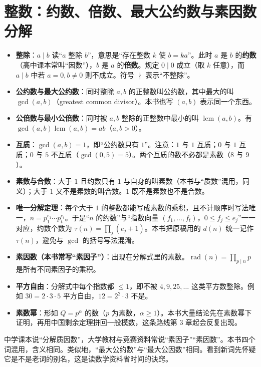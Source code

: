 \documentclass[UTF8,a4paper,11pt,oneside,openany,fontset=fandol]{ctexbook}
\theoremstyle{definition}
\newcommand{\lcm}{\operatorname{lcm}}
\newcommand{\rad}{\operatorname{rad}}
\begin{document}
\section{整数：约数、倍数、最大公约数与素因数分解}
\begin{itemize}
\item \textbf{整除}：$a\mid b$ 读“$a$ 整除 $b$”，意思是“存在整数 $k$ 使 $b=ka$”。此时 $a$ 是 $b$ 的\textbf{约数}（高中课本常叫“因数”），$b$ 是 $a$ 的\textbf{倍数}。规定 $0\mid 0$ 成立（取 $k$ 任意），而 $a\mid b$ 中若 $a=0,b\ne0$ 则不成立。符号 $\nmid$ 表示“不整除”。
\item \textbf{公约数与最大公约数}：同时整除 $a,b$ 的正整数叫公约数，其中最大的叫 $\gcd(a,b)$（greatest common divisor）。本书也写 $(a,b)$ 表示同一个东西。
\item \textbf{公倍数与最小公倍数}：同时被 $a,b$ 整除的正整数中最小的叫 $\lcm(a,b)$。有 $\gcd(a,b)\lcm(a,b)=ab$（$a,b>0$）。
\item \textbf{互质}：$\gcd(a,b)=1$，即“公约数只有 $1$”。注意：$1$ 与 $1$ 互质；$0$ 与 $1$ 互质；$0$ 与 $5$ 不互质（$\gcd(0,5)=5$）。两个互质的数不必都是素数（$8$ 与 $9$）。
\item \textbf{素数与合数}：大于 $1$ 且约数只有 $1$ 与自身的叫素数（本书与“质数”混用，同义）；大于 $1$ 又不是素数的叫合数。$1$ 既不是素数也不是合数。
\item \textbf{唯一分解定理}：每个大于 $1$ 的整数都能写成素数的乘积，且不计顺序时写法唯一，$n=p_1^{e_1}\cdots p_t^{e_t}$。于是“$n$ 的约数”与“指数向量 $(f_1,\ldots,f_t)$，$0\le f_j\le e_j$”一一对应，约数个数为
$\tau(n)=\prod_j(e_j+1)$。本书把原稿用的 $d(n)$ 统一记作 $\tau(n)$，避免与 $\gcd$ 的括号写法混淆。
\item \textbf{素因数（本书常写“素因子”）}：出现在分解式里的素数。$\rad(n)=\prod_{p\mid n}p$ 是所有不同素因子的乘积。
\item \textbf{平方自由}：分解式中每个指数都 $\le1$，即不被 $4,9,25,\ldots$ 这类平方数整除。例如 $30=2\cdot3\cdot5$ 平方自由，$12=2^2\cdot3$ 不是。
\item \textbf{素数幂}：形如 $Q=p^\alpha$ 的数（$p$ 为素数，$\alpha\ge1$）。本书大量结论先在素数幂下证明，再用中国剩余定理拼回一般模数，这条路线第 3 章起会反复出现。
\end{itemize}

\begin{tip}
中学课本说“分解质因数”，大学教材与竞赛资料常说“素因子”“素因数”。本书四个词混用，含义相同。类似地，“最大公约数”与“最大公因数”相同。看到新词先怀疑它是不是老词的别名，这是读数学资料省时间的诀窍。
\end{tip}
\end{document}
